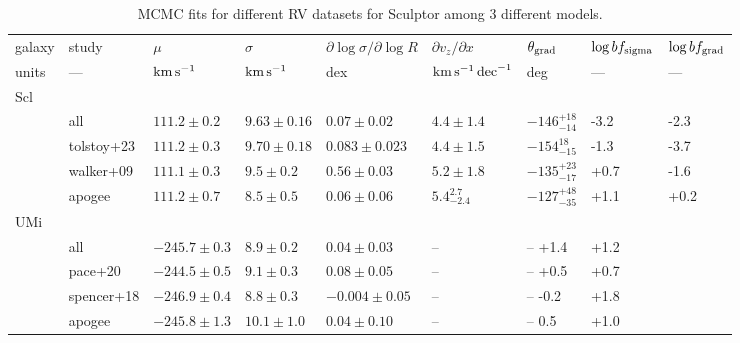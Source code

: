 \begin{landscape}
\begin{table*}[t]
\centering
\caption[Sculptor RV fits]{MCMC fits for different RV datasets for Sculptor among 3 different models. }
\label{tbl:scl_rv_mcmc}
\begin{tabular}{lllllllll}
\toprule
galaxy & study & $\mu$ & $\sigma$ & $\partial \log\sigma / \partial \log R$ & $\partial v_z / \partial x$  & $\theta_{\rm grad}$ & $\log bf_{\rm sigma}$ & $\log bf_{\rm grad}$\\
units & --- & ${\rm km\,s^{-1}}$ & ${\rm km\,s^{-1}}$ & dex & ${\rm km\,s^{-1}}\,{\rm dec}^{-1}$ & deg & --- & --- \\
\midrule
Scl \\
& all  & $111.2\pm0.2$ & $9.63\pm0.16$ & $0.07\pm0.02$ & $4.4 \pm 1.4$& $-146_{-14}^{+18}$ & -3.2 & -2.3\\
& tolstoy+23 & $111.2 \pm 0.3$ & $9.70\pm0.18$ & $0.083 \pm 0.023$ & $4.4\pm1.5$ & $-154_{-15}^{18}$ & -1.3 & -3.7 \\
& walker+09 & $111.1\pm0.3$ & $9.5\pm0.2$ & $0.56\pm0.03$ & $5.2\pm1.8$ & $-135_{-17}^{+23}$ & +0.7 & -1.6 \\
& apogee  & $111.2\pm0.7$ & $8.5\pm0.5$ & $0.06\pm0.06$ & $5.4_{-2.4}^{2.7}$ & $-127_{-35}^{+48}$ & +1.1 & +0.2 \\
\midrule
UMi \\
& all & $-245.7\pm0.3$ & $8.9\pm0.2$ & $0.04 \pm 0.03$ & -- & -- +1.4 & +1.2 \\
& pace+20 & $-244.5\pm0.5$ & $9.1\pm0.3$ & $0.08 \pm 0.05$ & -- & -- +0.5 & +0.7 \\
& spencer+18 & $-246.9\pm0.4$ & $8.8\pm0.3$ & $-0.004 \pm 0.05$ & -- & -- -0.2 & +1.8 \\
& apogee & $-245.8\pm1.3$ & $10.1\pm1.0$ & $0.04 \pm 0.10$ & -- & -- 0.5 & +1.0 \\
\bottomrule
\end{tabular}
\end{table*}

\end{landscape}

